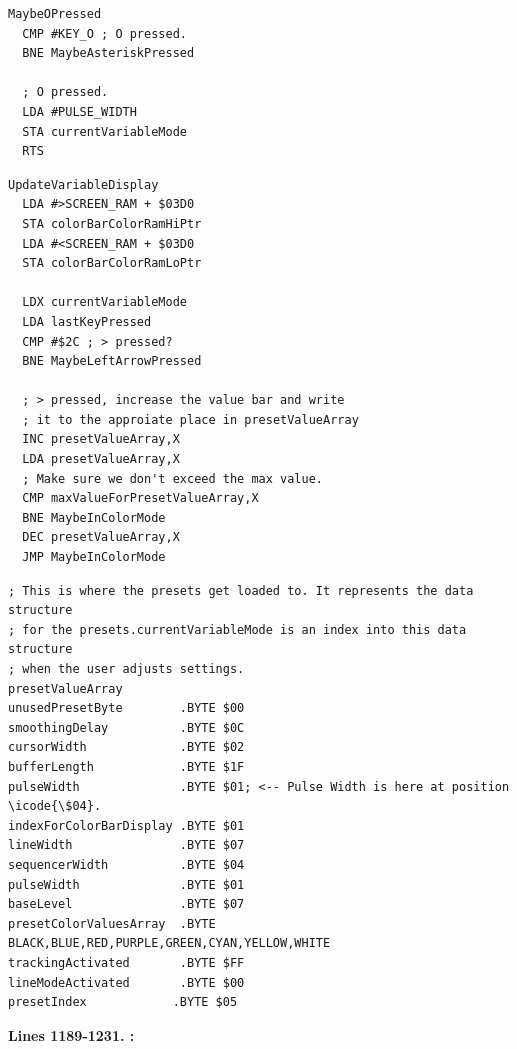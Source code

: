 \clearpage
\begin{lstlisting}[caption=From \icode{CheckKeyboardInput}.]
MaybeOPressed   
  CMP #KEY_O ; O pressed.
  BNE MaybeAsteriskPressed

  ; O pressed.
  LDA #PULSE_WIDTH
  STA currentVariableMode
  RTS 
\end{lstlisting}
\begin{lstlisting}[caption=From \icode{CheckKeyboardInputForActiveVariable}. Pressing the < and > keys increments and
decrements the value in presetValueArray pointed to by \icode{X}\, i.e. \icode{currentVariableMode}.]
UpdateVariableDisplay   
  LDA #>SCREEN_RAM + $03D0
  STA colorBarColorRamHiPtr
  LDA #<SCREEN_RAM + $03D0
  STA colorBarColorRamLoPtr

  LDX currentVariableMode
  LDA lastKeyPressed
  CMP #$2C ; > pressed?
  BNE MaybeLeftArrowPressed

  ; > pressed, increase the value bar and write
  ; it to the approiate place in presetValueArray
  INC presetValueArray,X
  LDA presetValueArray,X
  ; Make sure we don't exceed the max value.
  CMP maxValueForPresetValueArray,X
  BNE MaybeInColorMode
  DEC presetValueArray,X
  JMP MaybeInColorMode
\end{lstlisting}

\begin{lstlisting}[basicstyle=\ttfamily\scriptsize,caption=From \icode{ActivateSequencer}.]
; This is where the presets get loaded to. It represents the data structure
; for the presets.currentVariableMode is an index into this data structure
; when the user adjusts settings.
presetValueArray
unusedPresetByte        .BYTE $00
smoothingDelay          .BYTE $0C
cursorWidth             .BYTE $02
bufferLength            .BYTE $1F
pulseWidth              .BYTE $01; <-- Pulse Width is here at position \icode{\$04}.
indexForColorBarDisplay .BYTE $01
lineWidth               .BYTE $07
sequencerWidth          .BYTE $04 
pulseWidth              .BYTE $01
baseLevel               .BYTE $07
presetColorValuesArray  .BYTE BLACK,BLUE,RED,PURPLE,GREEN,CYAN,YELLOW,WHITE
trackingActivated       .BYTE $FF
lineModeActivated       .BYTE $00
presetIndex            .BYTE $05
\end{lstlisting}

\clearpage

\textbf{Lines 1189-1231. :} 
\clearpage


